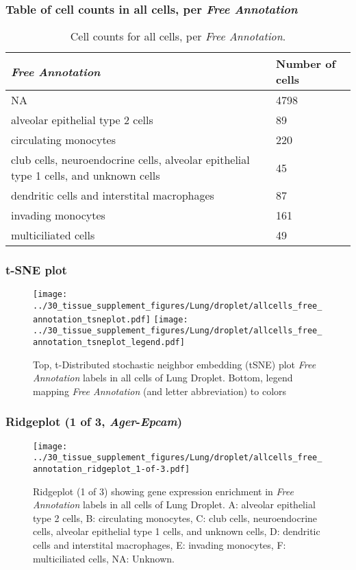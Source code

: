 \subsubsection{Table of cell counts in all cells, per \emph{Free Annotation}}\begin{table}[h]
\centering
\label{my-label}
\begin{tabular}{@{}ll@{}}
\toprule

\emph{Free Annotation}& Number of cells \\ \midrule
NA & 4798 \\

alveolar epithelial type 2 cells & 89 \\

circulating monocytes & 220 \\

club cells, neuroendocrine cells, alveolar epithelial type 1 cells, and unknown cells & 45 \\

dendritic cells and interstital macrophages & 87 \\

invading monocytes & 161 \\

multiciliated cells & 49 \\
\bottomrule
\end{tabular}
\caption{Cell counts for all cells, per \emph{Free Annotation}.}
\end{table}

\clearpage
\subsubsection{t-SNE plot}
\begin{figure}[h]
\centering
\texttt{[image: ../30\_tissue\_supplement\_figures/Lung/droplet/allcells\_free\_annotation\_tsneplot.pdf]}
\texttt{[image: ../30\_tissue\_supplement\_figures/Lung/droplet/allcells\_free\_annotation\_tsneplot\_legend.pdf]}
\caption{Top, t-Distributed stochastic neighbor embedding (tSNE) plot  \emph{Free Annotation} labels in all cells of Lung Droplet. Bottom, legend mapping \emph{Free Annotation} (and letter abbreviation) to colors}
\end{figure}


\clearpage

\subsubsection{Ridgeplot (1 of 3, \emph{Ager}-\emph{Epcam})}
\begin{figure}[h]
\centering
\texttt{[image: ../30\_tissue\_supplement\_figures/Lung/droplet/allcells\_free\_annotation\_ridgeplot\_1-of-3.pdf]}

\caption{ Ridgeplot (1 of 3)  showing gene expression enrichment in \emph{Free Annotation} labels in all cells of Lung Droplet. A: alveolar epithelial type 2 cells, B: circulating monocytes, C: club cells, neuroendocrine cells, alveolar epithelial type 1 cells, and unknown cells, D: dendritic cells and interstital macrophages, E: invading monocytes, F: multiciliated cells, NA: Unknown.}
\end{figure}


